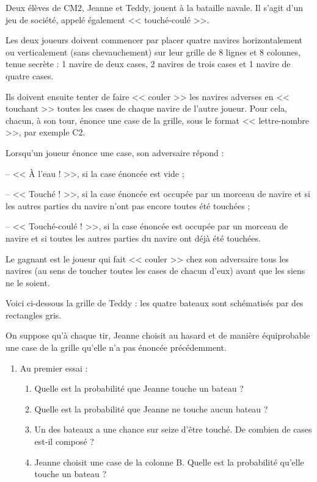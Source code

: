 Deux élèves de CM2, Jeanne et Teddy, jouent à la bataille navale. Il s’agit d’un jeu de société, appelé également << touché-coulé >>. \par
   Les deux joueurs doivent commencer par placer quatre navires horizontalement ou verticalement (sans chevauchement) sur leur grille de 8 lignes et 8 colonnes, tenue secrète : 1 navire de deux cases, 2 navires de trois cases et 1 navire de quatre cases. \par
   Ils doivent ensuite tenter de faire << couler >> les navires adverses en << touchant >> toutes les cases de chaque navire de l’autre joueur. Pour cela, chacun, à son tour, énonce une case de la grille, sous le format << lettre-nombre >>, par exemple C2. \par
   Lorsqu’un joueur énonce une case, son adversaire répond : \par
   -- << À l’eau ! >>, si la case énoncée est vide ; \par
   -- << Touché ! >>, si la case énoncée est occupée par un morceau de navire et si les autres parties du navire n’ont pas encore toutes été touchées ; \par
   -- << Touché-coulé ! >>, si la case énoncée est occupée par un morceau de navire et si toutes les autres parties du navire ont déjà été touchées. \par
   Le gagnant est le joueur qui fait << couler >> chez son adversaire tous les navires (au sens de toucher toutes les cases de chacun d’eux) avant que les siens ne le soient. \par \medskip
   Voici ci-dessous la grille de Teddy : les quatre bateaux sont schématisés par des rectangles gris. \par
   \begin{minipage}{8.5cm}
      On suppose qu’à chaque tir, Jeanne choisit au hasard et de manière équiprobable une case de la grille qu’elle n’a pas énoncée précédemment.
      \begin{enumerate}
         \item Au premier essai :
            \begin{enumerate}
               \setlength{\itemsep}{-1mm}
               \item Quelle est la probabilité que Jeanne touche un bateau ?
               \item Quelle est la probabilité que Jeanne ne touche aucun bateau ?
               \item Un des bateaux a une chance sur seize d'être touché. De combien de cases est-il composé ?
               \item Jeanne choisit une case de la colonne B. Quelle est la probabilité qu’elle touche un bateau ?
            \end{enumerate}
      \end{enumerate}
   \end{minipage}
